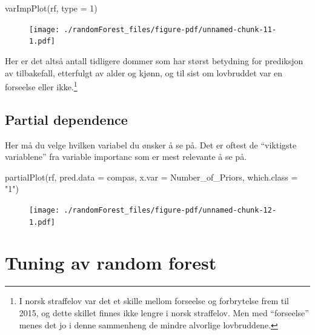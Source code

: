 \documentclass[
  letterpaper,
  DIV=11,
  numbers=noendperiod]{scrreprt}
\newenvironment{Shaded}{\begin{snugshade}}{\end{snugshade}}
\newcommand{\AttributeTok}[1]{\textcolor[rgb]{0.40,0.45,0.13}{#1}}
\newcommand{\DecValTok}[1]{\textcolor[rgb]{0.68,0.00,0.00}{#1}}
\newcommand{\FunctionTok}[1]{\textcolor[rgb]{0.28,0.35,0.67}{#1}}
\newcommand{\NormalTok}[1]{\textcolor[rgb]{0.00,0.23,0.31}{#1}}
\newcommand{\StringTok}[1]{\textcolor[rgb]{0.13,0.47,0.30}{#1}}
\theoremstyle{definition}
\theoremstyle{remark}
\begin{document}
\begin{Shaded}
\begin{Highlighting}[]
\FunctionTok{varImpPlot}\NormalTok{(rf, }\AttributeTok{type =} \DecValTok{1}\NormalTok{)}
\end{Highlighting}
\end{Shaded}

\begin{figure}[H]

{\centering \texttt{[image: ./randomForest\_files/figure-pdf/unnamed-chunk-11-1.pdf]}

}

\end{figure}

Her er det altså antall tidligere dommer som har størst betydning for
prediksjon av tilbakefall, etterfulgt av alder og kjønn, og til sist om
lovbruddet var en forseelse eller ikke.\footnote{I norsk straffelov var
  det et skille mellom forseelse og forbrytelse frem til 2015, og dette
  skillet finnes ikke lengre i norsk straffelov. Men med ``forseelse''
  menes det jo i denne sammenheng de mindre alvorlige lovbruddene.}

\hypertarget{partial-dependence}{%
\subsection{Partial dependence}\label{partial-dependence}}

Her må du velge hvilken variabel du ønsker å se på. Det er oftest de
``viktigste variablene'' fra variable importanc som er mest relevante å
se på.

\begin{Shaded}
\begin{Highlighting}[]
\FunctionTok{partialPlot}\NormalTok{(rf, }\AttributeTok{pred.data =}\NormalTok{ compas, }
            \AttributeTok{x.var =}\NormalTok{ Number\_of\_Priors, }
            \AttributeTok{which.class =} \StringTok{"1"}\NormalTok{)}
\end{Highlighting}
\end{Shaded}

\begin{figure}[H]

{\centering \texttt{[image: ./randomForest\_files/figure-pdf/unnamed-chunk-12-1.pdf]}

}

\end{figure}

\hypertarget{tuning-av-random-forest}{%
\section{Tuning av random forest}\label{tuning-av-random-forest}}
\end{document}
